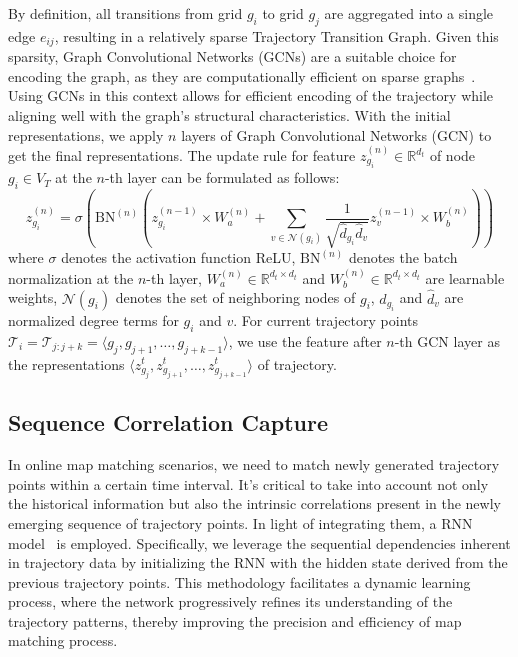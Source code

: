 By definition, all transitions from grid $g_i$ to grid $g_j$ are aggregated into a single edge $e_{ij}$, resulting in a relatively sparse Trajectory Transition Graph. Given this sparsity, Graph Convolutional Networks (GCNs) are a suitable choice for encoding the graph, as they are computationally efficient on sparse graphs~\cite{GCN}. Using GCNs in this context allows for efficient encoding of the trajectory while aligning well with the graph’s structural characteristics. With the initial representations, we apply $n$ layers of Graph Convolutional Networks (GCN) to get the final representations. The update rule for feature $z_{g_i}^{(n)} \in \mathbb{R}^{d_t}$ of node $g_i \in V_T$ at the $n$-th layer can be formulated as follows:
\begin{equation}
    z_{g_i}^{(n)} = \sigma (\text{BN}^{(n)} (z_{g_i}^{(n-1)} \times {W}_a^{(n)} + \sum_{v \in \mathcal{N}(g_i)} \frac{1}{\sqrt{\hat{d}_{g_i} \hat{d}_v}} z_{v}^{(n-1)} \times {W}_b^{(n)} ))
\end{equation}
where $\sigma$ denotes the activation function ReLU, $\text{BN}^{(n)}$ denotes the batch normalization at the $n$-th layer, ${W}_a^{(n)} \in \mathbb{R}^{d_t \times d_t}$ and ${W}_b^{(n)} \in \mathbb{R}^{d_t \times d_t}$ are learnable weights, $\mathcal{N}(g_i)$ denotes the set of neighboring nodes of $g_i$, $\hat{d}_{g_i}$ and $\hat{d}_v$ are normalized degree terms for $g_i$ and $v$. For current
trajectory points $\mathcal{T}_i = \mathcal{T}_{j:j+k} = \langle g_j, g_{j+1}, \ldots, g_{j+k-1} \rangle$, we use the feature after $n$-th GCN layer as the representations $\langle z_{g_j}^{t}, z_{g_{j+1}}^{t}, \ldots, z_{g_{j+k-1}}^{t} \rangle$ of trajectory.

\subsection{Sequence Correlation Capture}
\label{sec:4.2}

In online map matching scenarios, we need to match newly generated trajectory points within a certain time interval. It's critical to take into account not only the historical information but also the intrinsic correlations present in the newly emerging sequence of trajectory points. In light of integrating them, a RNN model~\cite{RNN} is employed. Specifically, we leverage the sequential dependencies inherent in trajectory data by initializing the RNN with the hidden state derived from the previous trajectory points. This methodology facilitates a dynamic learning process, where the network progressively refines its understanding of the trajectory patterns, thereby improving the precision and efficiency of map matching process. 

